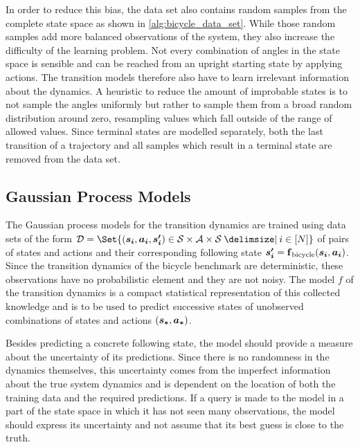 In order to reduce this bias, the data set also contains random samples from the complete state space as shown in \cref{alg:bicycle_data_set}.
While those random samples add more balanced observations of the system, they also increase the difficulty of the learning problem.
Not every combination of angles in the state space is sensible and can be reached from an upright starting state by applying actions.
The transition models therefore also have to learn irrelevant information about the dynamics.
A heuristic to reduce the amount of improbable states is to not sample the angles uniformly but rather to sample them from a broad random distribution around zero, resampling values which fall outside of the range of allowed values.
Since terminal states are modelled separately, both the last transition of a trajectory and all samples which result in a terminal state are removed from the data set.

\subsection{Gaussian Process Models}
\label{sub:gp_models}
The Gaussian process models for the transition dynamics are trained using data sets of the form $\D = \Set{(\mat{s_i}, \mat{a_i}, \mat{s_i^\prime}) \in \Es \times \Ah \times \Es \with i \in [N]}$ of pairs of states and actions and their corresponding following state $\bm{s_i^\prime} = \operatorname{\operatorname{\mathbf{f}}_{\text{bicycle}}}(\bm{s_i}, \bm{a_i})$.
Since the transition dynamics of the bicycle benchmark are deterministic, these observations have no probabilistic element and they are not noisy.
The model $f$ of the transition dynamics is a compact statistical representation of this collected knowledge and is to be used to predict successive states of unobserved combinations of states and actions $(\bm{s_\ast}, \bm{a_\ast})$.

Besides predicting a concrete following state, the model should provide a measure about the uncertainty of its predictions.
Since there is no randomness in the dynamics themselves, this uncertainty comes from the imperfect information about the true system dynamics and is dependent on the location of both the training data and the required predictions.
If a query is made to the model in a part of the state space in which it has not seen many observations, the model should express its uncertainty and not assume that its best guess is close to the truth.

